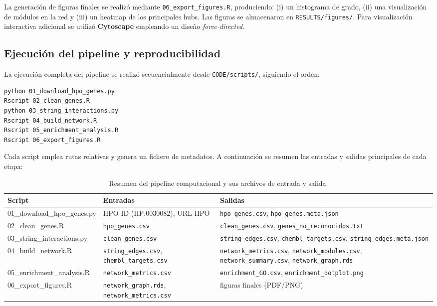 La generación de figuras finales se realizó mediante \texttt{06\_export\_figures.R}, produciendo: (i) un histograma de grado, (ii) una visualización de módulos en la red y (iii) un heatmap de los principales hubs. Las figuras se almacenaron en \texttt{RESULTS/figures/}. Para visualización interactiva adicional se utilizó \textbf{Cytoscape} \cite{Shannon2003_cytoscape} empleando un diseño \textit{force-directed}.

\subsection{Ejecución del pipeline y reproducibilidad}

La ejecución completa del pipeline se realizó secuencialmente desde \texttt{CODE/scripts/}, siguiendo el orden:

\begin{verbatim}
python 01_download_hpo_genes.py
Rscript 02_clean_genes.R
python 03_string_interactions.py
Rscript 04_build_network.R
Rscript 05_enrichment_analysis.R
Rscript 06_export_figures.R
\end{verbatim}

Cada script emplea rutas relativas y genera un fichero de metadatos.  
A continuación se resumen las entradas y salidas principales de cada etapa:

\begin{table}[h!]
\centering
\begin{tabular}{|p{3cm}|p{4.5cm}|p{5.5cm}|}
\hline
\textbf{Script} & \textbf{Entradas} & \textbf{Salidas} \\
\hline
01\_download\_hpo\_genes.py & HPO ID (HP:0030082), URL HPO & 
\texttt{hpo\_genes.csv}, \texttt{hpo\_genes.meta.json} \\
\hline
02\_clean\_genes.R & \texttt{hpo\_genes.csv} &
\texttt{clean\_genes.csv}, \texttt{genes\_no\_reconocidos.txt} \\
\hline
03\_string\_interactions.py & \texttt{clean\_genes.csv} &
\texttt{string\_edges.csv}, \texttt{chembl\_targets.csv}, \texttt{string\_edges.meta.json} \\
\hline
04\_build\_network.R & \texttt{string\_edges.csv}, \texttt{chembl\_targets.csv} &
\texttt{network\_metrics.csv}, \texttt{network\_modules.csv}, 
\texttt{network\_summary.csv}, \texttt{network\_graph.rds} \\
\hline
05\_enrichment\_analysis.R & \texttt{network\_metrics.csv} &
\texttt{enrichment\_GO.csv}, \texttt{enrichment\_dotplot.png} \\
\hline
06\_export\_figures.R & \texttt{network\_graph.rds}, \texttt{network\_metrics.csv} &
figuras finales (PDF/PNG) \\
\hline
\end{tabular}
\caption{Resumen del pipeline computacional y sus archivos de entrada y salida.}
\end{table}
